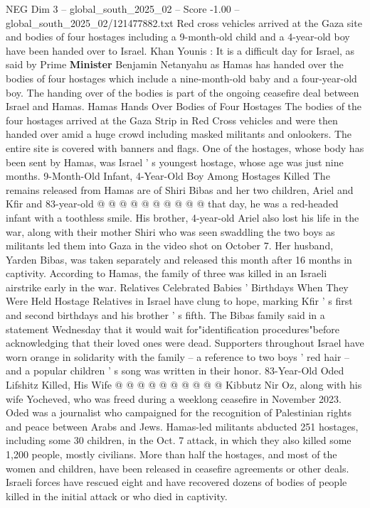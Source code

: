 \begin{textsample}{NEG Dim 3 – global\_south\_2025\_02 – Score -1.00 – global\_south\_2025\_02/121477882.txt}  \label{ex:f3_neg_020}
Red cross vehicles arrived at the Gaza site and bodies of four hostages including a 9-month-old child and a 4-year-old boy have been handed over to Israel.
Khan Younis : It is a difficult day for Israel, as said by Prime \textbf{Minister} Benjamin Netanyahu as Hamas has handed over the bodies of four hostages which include a nine-month-old baby and a four-year-old boy.
The handing over of the bodies is part of the ongoing ceasefire deal between Israel and Hamas.
Hamas Hands Over Bodies of Four Hostages The bodies of the four hostages arrived at the Gaza Strip in Red Cross vehicles and were then handed over amid a huge crowd including masked militants and onlookers.
The entire site is covered with banners and flags.
One of the hostages, whose body has been sent by Hamas, was Israel ' s youngest hostage, whose age was just nine months. 9-Month-Old Infant, 4-Year-Old Boy Among Hostages Killed The remains released from Hamas are of Shiri Bibas and her two children, Ariel and Kfir and 83-year-old @ @ @ @ @ @ @ @ @ @ that day, he was a red-headed infant with a toothless smile.
His brother, 4-year-old Ariel also lost his life in the war, along with their mother Shiri who was seen swaddling the two boys as militants led them into Gaza in the video shot on October 7.
Her husband, Yarden Bibas, was taken separately and released this month after 16 months in captivity.
According to Hamas, the family of three was killed in an Israeli airstrike early in the war.
Relatives Celebrated Babies ' Birthdays When They Were Held Hostage Relatives in Israel have clung to hope, marking Kfir ' s first and second birthdays and his brother ' s fifth.
The Bibas family said in a statement Wednesday that it would wait for"identification procedures"before acknowledging that their loved ones were dead.
Supporters throughout Israel have worn orange in solidarity with the family -- a reference to two boys ' red hair -- and a popular children ' s song was written in their honor. 83-Year-Old Oded Lifshitz Killed, His Wife @ @ @ @ @ @ @ @ @ @ Kibbutz Nir Oz, along with his wife Yocheved, who was freed during a weeklong ceasefire in November 2023.
Oded was a journalist who campaigned for the recognition of Palestinian rights and peace between Arabs and Jews.
Hamas-led militants abducted 251 hostages, including some 30 children, in the Oct. 7 attack, in which they also killed some 1,200 people, mostly civilians.
More than half the hostages, and most of the women and children, have been released in ceasefire agreements or other deals.
Israeli forces have rescued eight and have recovered dozens of bodies of people killed in the initial attack or who died in captivity.

\end{textsample}
